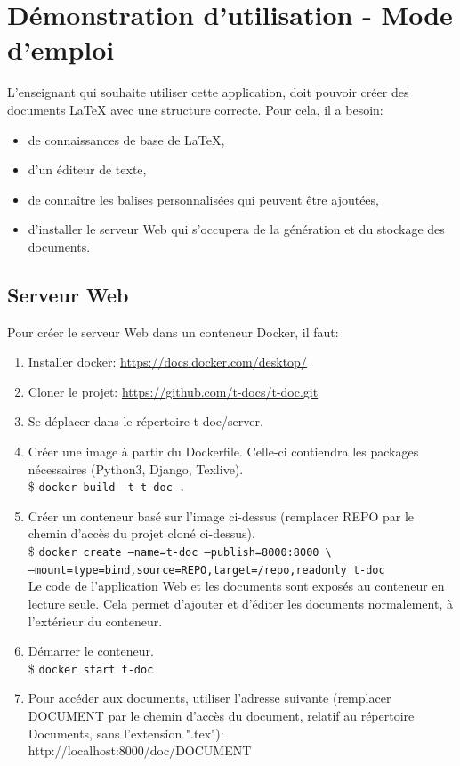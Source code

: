 \documentclass[12pt,titlepage,oneside]{article}
\renewcommand{\footnote}[1]{}
\begin{document}
\newpage

\section{Démonstration d'utilisation - Mode d'emploi}
L'enseignant qui souhaite utiliser cette application, doit pouvoir créer des documents LaTeX avec une structure correcte. Pour cela, il a besoin:
\begin{itemize}
\item de connaissances de base de LaTeX,
\item d'un éditeur de texte,
\item de connaître les balises personnalisées qui peuvent être ajoutées,
\item d'installer le serveur Web qui s'occupera de la génération et du stockage des documents.
\end{itemize}

\subsection{Serveur Web}
Pour créer le serveur Web dans un conteneur Docker\footnote{\url{https://docs.docker.com/}}, il faut:
\begin{enumerate}
  \item Installer docker: \url{https://docs.docker.com/desktop/}
  \item Cloner le projet: \url{https://github.com/t-docs/t-doc.git}
  \item Se déplacer dans le répertoire t-doc/server.
  \item Créer une image à partir du Dockerfile. Celle-ci contiendra les packages nécessaires (Python3, Django, Texlive).\\
  \$ \texttt{docker build -t t-doc .}
  \item Créer un conteneur basé sur l'image ci-dessus (remplacer REPO par le chemin d'accès du projet cloné ci-dessus).\\
  \$ \texttt{docker create --name=t-doc --publish=8000:8000 \textbackslash\\
  --mount=type=bind,source=REPO,target=/repo,readonly t-doc}\\
  Le code de l'application Web et les documents sont exposés au conteneur en lecture seule. Cela permet d'ajouter et d'éditer les documents normalement, à l'extérieur du conteneur.
  \item Démarrer le conteneur.\\
  \$ \texttt{docker start t-doc}
  \item Pour accéder aux documents, utiliser l'adresse suivante (remplacer DOCUMENT par le chemin d'accès du document, relatif au répertoire Documents, sans l'extension ".tex"):\\
  http://localhost:8000/doc/DOCUMENT
\end{enumerate}
\end{document}
